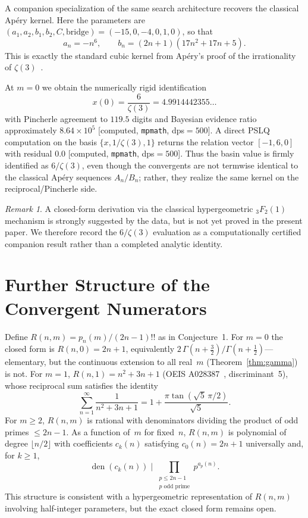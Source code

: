 \documentclass[11pt,a4paper]{article}
\theoremstyle{definition}
\theoremstyle{remark}
\newtheorem{remark}[theorem]{Remark}
\begin{document}
A companion specialization of the same search architecture recovers the
classical Ap\'ery kernel. Here the parameters are
$(a_1,a_2,b_1,b_2,C,\mathrm{bridge}) = (-15,0,-4,0,1,0)$, so that
\begin{equation}\label{eq:apery-basin-kernel}
  a_n = -n^6,
  \qquad
  b_n = (2n+1)(17n^2+17n+5).
\end{equation}
This is exactly the standard cubic kernel from Ap\'ery's proof of the
irrationality of $\zeta(3)$~\cite{apery1979}.

At $m=0$ we obtain the numerically rigid identification
\[
  x(0) = \frac{6}{\zeta(3)} = 4.9914442355\ldots
\]
with Pincherle agreement to $119.5$ digits and Bayesian evidence ratio
approximately $8.64 \times 10^5$
[computed, \texttt{mpmath}, dps$=500$]. A direct PSLQ computation on the basis
$\{x,1/\zeta(3),1\}$ returns the relation vector $[-1,6,0]$ with residual
$0.0$ [computed, \texttt{mpmath}, dps$=500$]. Thus the basin value is firmly
identified as $6/\zeta(3)$, even though the convergents are not termwise
identical to the classical Ap\'ery sequences $A_n/B_n$; rather, they realize
the same kernel on the reciprocal/Pincherle side.

\begin{remark}
A closed-form derivation via the classical hypergeometric
${}_3F_2(1)$ mechanism is strongly suggested by the data, but is not yet proved
in the present paper. We therefore record the $6/\zeta(3)$ evaluation as a
computationally certified companion result rather than a completed analytic
identity.
\end{remark}

\section{Further Structure of the Convergent Numerators}\label{sec:structural}

Define $R(n,m) = p_n(m)/(2n{-}1)!!$ as in Conjecture~1.
For $m = 0$ the closed form is $R(n,0) = 2n+1$, equivalently
$2\,\Gamma(n{+}\tfrac{3}{2})/\Gamma(n{+}\tfrac{1}{2})$---elementary, but the
continuous extension to all real~$m$ (Theorem~\ref{thm:gamma}) is not.
For $m = 1$, $R(n,1) = n^2 + 3n + 1$ (OEIS A028387~\cite{oeis_A028387}, discriminant~5),
whose reciprocal sum satisfies the identity
\[
  \sum_{n=1}^{\infty} \frac{1}{n^2 + 3n + 1}
  = 1 + \frac{\pi \tan(\sqrt{5}\,\pi/2)}{\sqrt{5}}.
\]
For $m \ge 2$, $R(n,m)$ is rational with denominators dividing the product
of odd primes $\le 2n{-}1$. As a function of~$m$ for fixed~$n$, $R(n,m)$ is
polynomial of degree $\lfloor n/2 \rfloor$ with coefficients $c_k(n)$
satisfying $c_0(n) = 2n{+}1$ universally and, for $k \ge 1$,
\[
  \operatorname{den}(c_k(n)) \;\Big|\;
  \prod_{\substack{p \le 2n{-}1 \\ p \text{ odd prime}}} p^{a_p(n)}.
\]
This structure is consistent with a hypergeometric representation of $R(n,m)$
involving half-integer parameters, but the exact closed form remains open.
\end{document}
